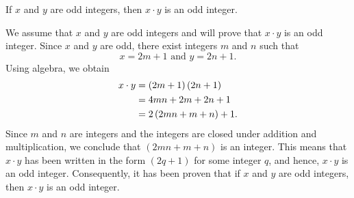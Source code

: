 \begin{theorem}\label{T:xyodd}
If  $x$  and  $y$  are odd integers, then  $x \cdot y$  is an odd integer.
\end{theorem}
\begin{myproof}
We assume that  $x$  and  $y$  are odd integers and will prove that  $x \cdot y$ is an odd integer.  Since $x$ and $y$ are odd, there exist integers  $m$  and  $n$  such that
\[
x = 2m + 1 \text{ and } y = 2n + 1.
\]
Using algebra, we obtain
\begin{align}
  x \cdot y &= \left( {2m + 1} \right)\left( {2n + 1} \right) \notag \\
   &= 4mn + 2m + 2n + 1 \notag \\
   &= 2\left( {2mn + m + n} \right) + 1. \notag
\end{align}
 Since  $m$  and  $n$  are integers and the integers are closed under addition and multiplication, we conclude that  $\left( {2mn + m + n} \right)$ is an integer.  This means that  $x \cdot y$ has been written in the form  $\left( {2q + 1} \right)$ for some integer  $q$, and hence, $x \cdot y$ is an odd integer.  Consequently, it has been proven that if  $x$  and  $y$  are odd integers, then  $x \cdot y$ is an odd integer.
\end{myproof}
\hbreak

\endinput
